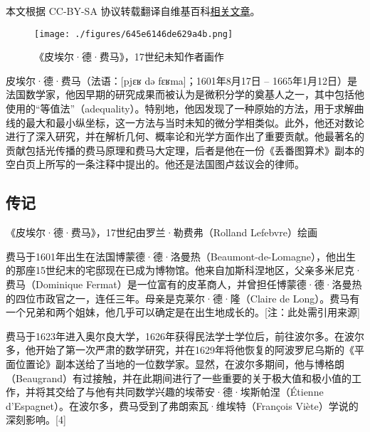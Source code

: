 
本文根据 CC-BY-SA 协议转载翻译自维基百科\href{https://en.wikipedia.org/wiki/Pierre_de_Fermat}{相关文章}。

\begin{figure}[ht]
\centering
\texttt{[image: ./figures/645e6146de629a4b.png]}
\caption{《皮埃尔·德·费马》，17世纪未知作者画作} \label{fig_Pierre_1}
\end{figure}
皮埃尔·德·费马（法语：[pjɛʁ də fɛʁma]；1601年8月17日 – 1665年1月12日）是法国数学家，他因早期的研究成果而被认为是微积分学的奠基人之一，其中包括他使用的“等值法”（adequality）。特别地，他因发现了一种原始的方法，用于求解曲线的最大和最小纵坐标，这一方法与当时未知的微分学相类似。此外，他还对数论进行了深入研究，并在解析几何、概率论和光学方面作出了重要贡献。他最著名的贡献包括光传播的费马原理和费马大定理，后者是他在一份《丢番图算术》副本的空白页上所写的一条注释中提出的。他还是法国图卢兹议会的律师。
\subsection{传记}
《皮埃尔·德·费马》，17世纪由罗兰·勒费弗（Rolland Lefebvre）绘画

费马于1601年出生在法国博蒙德·德·洛曼热（Beaumont-de-Lomagne），他出生的那座15世纪末的宅邸现在已成为博物馆。他来自加斯科涅地区，父亲多米尼克·费马（Dominique Fermat）是一位富有的皮革商人，并曾担任博蒙德·德·洛曼热的四位市政官之一，连任三年。母亲是克莱尔·德·隆（Claire de Long）。费马有一个兄弟和两个姐妹，他几乎可以确定是在出生地成长的。[注：此处需引用来源]

费马于1623年进入奥尔良大学，1626年获得民法学士学位后，前往波尔多。在波尔多，他开始了第一次严肃的数学研究，并在1629年将他恢复的阿波罗尼乌斯的《平面位置论》副本送给了当地的一位数学家。显然，在波尔多期间，他与博格朗（Beaugrand）有过接触，并在此期间进行了一些重要的关于极大值和极小值的工作，并将其交给了与他有共同数学兴趣的埃蒂安·德·埃斯帕涅（Étienne d'Espagnet）。在波尔多，费马受到了弗朗索瓦·维埃特（François Viète）学说的深刻影响。[4]